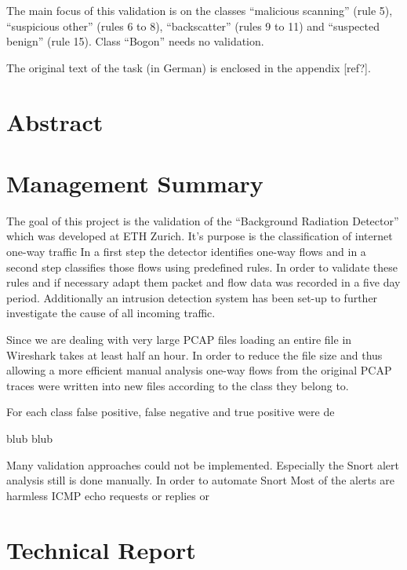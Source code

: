 \documentclass[a4paper]{scrartcl}
\begin{document}
The main focus of this validation is on the classes ``malicious scanning'' (rule 5), ``suspicious other'' (rules 6 to 8), ``backscatter'' (rules 9 to 11) and ``suspected benign'' (rule 15). Class ``Bogon'' needs no validation.

The original text of the task (in German) is enclosed in the appendix [ref?].
\newpage

\section{Abstract}

\section{Management Summary}
The goal of this project is the validation of the ``Background Radiation Detector'' which was developed at ETH Zurich. It's purpose is the classification of internet one-way traffic In a first step the detector identifies one-way flows and in a second step classifies those flows using predefined rules. In order to validate these rules and if necessary adapt them packet and flow data was recorded in a five day period. Additionally an intrusion detection system has been set-up to further investigate the cause of all incoming traffic.

Since we are dealing with very large PCAP files loading an entire file in Wireshark takes at least half an hour. In order to reduce the file size and thus allowing a more efficient manual analysis one-way flows from the original PCAP traces were written into new files according to the class they belong to.

For each class false positive, false negative and true positive were de


blub  blub

Many validation approaches could not be implemented. Especially the Snort alert analysis still is done manually. In order to automate Snort Most of the alerts are harmless ICMP echo requests or replies or 

\section{Technical Report}
\end{document}
